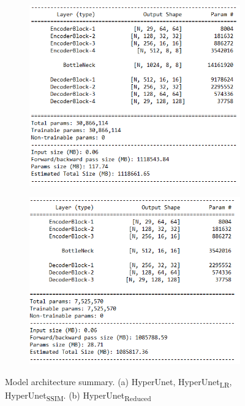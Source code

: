 \documentclass{article}
\begin{document}
\begin{figure}
  \centering
    \begin{subfigure}[b]{0.48\textwidth}
        \centering
        \includegraphics[width=\textwidth]{figs/model/model_summary_shortened.png}
        \caption{}
        \label{fig:Unet_Classic_model}
    \end{subfigure}
    \hfill      
    \begin{subfigure}[b]{0.48\textwidth}
        \centering
        \includegraphics[width=\textwidth]{figs/model/model_mini_summary_shortened.PNG}
        \caption{}
        \label{fig:Unet_reduced_model}
    \end{subfigure}
    \hfill      

  \caption{Model architecture summary. (a) HyperUnet, HyperUnet\textsubscript{LR}, HyperUnet\textsubscript{SSIM}. (b) HyperUnet\textsubscript{Reduced}}
  \label{fig:Unet_model}
\end{figure}
\end{document}
